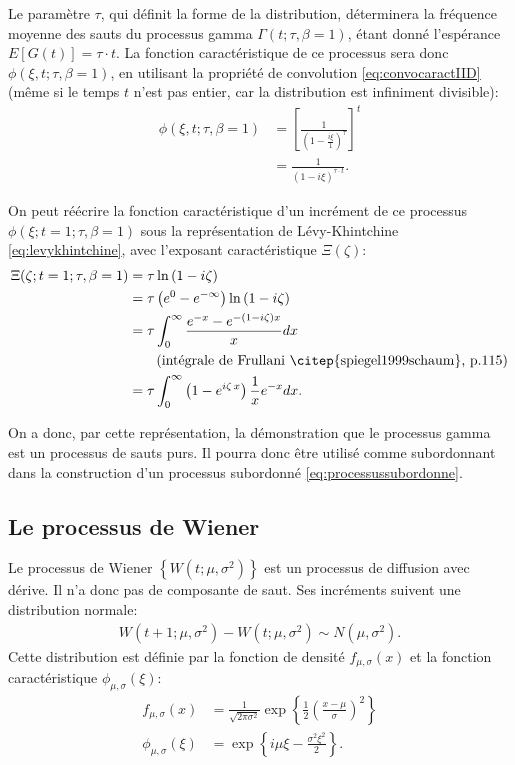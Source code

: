 Le paramètre $\tau$, qui définit la forme de la distribution,
déterminera la fréquence moyenne des sauts du processus gamma
$\Gamma(t;\tau,\beta=1)$, étant donné l'espérance $E[G(t)] = \tau\cdot
t$. La fonction caractéristique de ce processus sera donc
$\phi(\xi,t;\tau,\beta=1)$, en utilisant la propriété de convolution
\eqref{eq:convocaractIID} (même si le temps $t$ n'est pas entier, car
la distribution est infiniment divisible):
\begin{align}
  \phi(\xi,t;\tau,\beta=1) &= \left[\frac{1}{\left(1-\frac{i\xi}{1}\right)^{\tau}}\right]^t \nonumber\\
  &= \frac{1}{\left(1-i\xi\right)^{\tau\cdot t}}.
\end{align}

On peut réécrire la fonction caractéristique d'un incrément de ce
processus $\phi(\xi;t=1;\tau,\beta=1)$ sous la représentation de
Lévy-Khintchine \eqref{eq:levykhintchine}, avec l'exposant
caractéristique $\Xi(\zeta)$:
\begin{align}
  \label{eq:exposantchargamma}
  \Xi(\zeta;t=1;\tau,\beta=1) &= \tau\ln{\left(1-i\zeta\right)} \\
  &= \tau \left(e^{0} - e^{-\infty}\right) \ln{\left(1-i\zeta \right)} \nonumber\\
  &= \tau \int_{0}^{\infty} \frac{e^{-x} - e^{-(1-i\zeta)x}}{x} dx \nonumber\\
  &\qquad\mbox{(intégrale de Frullani \citep{spiegel1999schaum}, p.115)} \nonumber\\
  &= \tau \int_{0}^{\infty}
  \left(1-e^{i\zeta\,x}\right)\frac{1}{x}e^{-x}dx.
\end{align}

On a donc, par cette représentation, la démonstration que le processus
gamma est un processus de sauts purs. Il pourra donc être utilisé
comme subordonnant dans la construction d'un processus subordonné
\eqref{eq:processussubordonne}.

\subsection{Le processus de Wiener}
\label{sec:mouvementbrownien}

Le processus de Wiener $\left\{W(t;\mu,\sigma^2)\right\}$ est un
processus de diffusion avec dérive. Il n'a donc pas de composante de
saut. Ses incréments suivent une distribution normale:
\begin{align}
  \label{eq:incrwiener}
  W(t+1;\mu,\sigma^2) - W(t;\mu,\sigma^2) \sim N(\mu,\sigma^2).
\end{align}
Cette distribution est définie par la fonction de densité
$f_{\mu,\sigma}(x)$ et la fonction caractéristique
$\phi_{\mu,\sigma}(\xi)$:
\begin{align}
  f_{\mu,\sigma}(x) &= \frac{1}{\sqrt{2\pi\sigma^2}}\exp{\left\{\frac{1}{2} \left(\frac{x-\mu}{\sigma} \right)^2\right\}} \label{eq:fndensitenormale} \\
  \phi_{\mu,\sigma}(\xi) &= \exp\left\{
    i\mu\xi-\frac{\sigma^2\xi^2}{2}
  \right\} \label{eq:fncaractnormale}.
\end{align}

